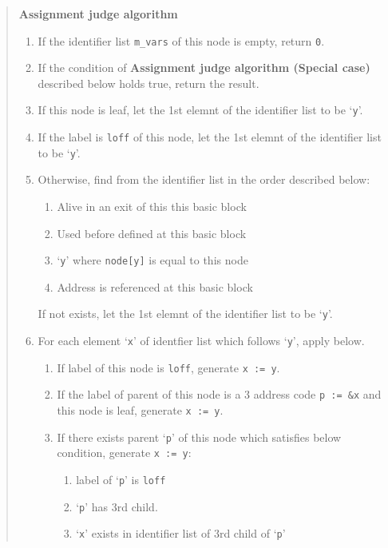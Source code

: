 \begin{quote}
{\bf Assignment judge algorithm}

\begin{enumerate}
\item If the identifier list {\tt{m\_vars}} of this node is empty,
      return {\tt{0}}.
\item  \label{optimize_e067}
      If the condition of
      {\bf Assignment judge algorithm (Special case) }
      described below holds true, return the result.
\item \label{optimize_e055}
      If this node is leaf, 
      let the 1st elemnt of the identifier list to be `{\tt{y}}'.
\item If the label is {\tt{loff}} of this node,
      let the 1st elemnt of the identifier list to be `{\tt{y}}'.
\item \label{optimize_e054}
      Otherwise,
      find from the identifier list in the order described below:
      \begin{enumerate}
      \item Alive in an exit of this this basic block
      \item Used before defined at this basic block
      \item `{\tt{y}}' where {\tt{node[y]}} is equal to this node
      \item Address is referenced at this basic block
      \end{enumerate}
      If not exists, let the 1st elemnt of the identifier list to be `{\tt{y}}'.
 \item 
      For each element `{\tt{x}}' of identfier list which follows `{\tt{y}}',
      apply below.
\begin{enumerate}
\item If label of this node is {\tt{loff}},  generate {\tt{x := y}}.
\item \label{optimize_e052}
      If the label of parent of this node is a 3 address code
      {\tt{p := \&x}} and this node is leaf, generate {\tt{x := y}}.
\item If there exists parent `{\tt{p}}' of this node which satisfies
      below condition, generate {\tt{x := y}}:
      \begin{enumerate}
      \item label of `{\tt{p}}' is {\tt{loff}}
      \item `{\tt{p}}' has 3rd child.
      \item `{\tt{x}}' exists in identifier list of 3rd child of `{\tt{p}}'
      \end{enumerate}

\end{enumerate}
\end{enumerate}
\end{quote}
